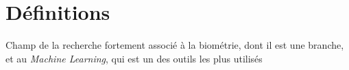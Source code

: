 \section{Définitions}
Champ de la recherche fortement associé à la biométrie, dont il est une branche, et au \textit{Machine Learning}, qui est un des outils les plus utilisés


